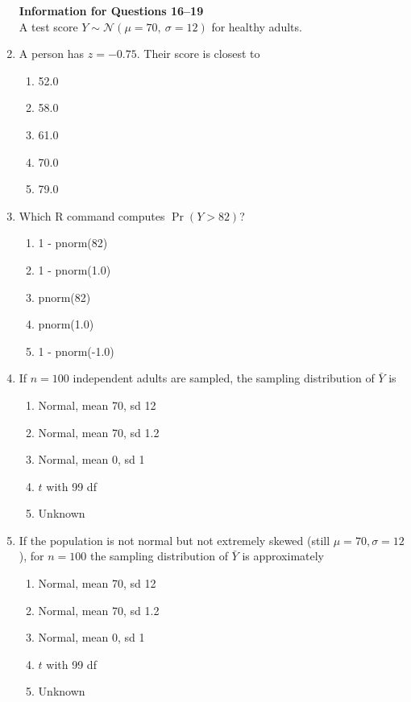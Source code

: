 \documentclass{article}
\begin{document}
\begin{enumerate}
\textbf{Information for Questions 16--19}\\
A test score $Y\sim \mathcal N(\mu=70,\ \sigma=12)$ for healthy adults.
\item A person has $z=-0.75$. Their score is closest to
    \begin{enumerate}[label=\Alph*.]
        \item 52.0
        \item 58.0
        \item 61.0
        \item 70.0
        \item 79.0
    \end{enumerate}
\item Which R command computes $\Pr(Y>82)$?
    \begin{enumerate}[label=\Alph*.]
        \item 1 - pnorm(82)
        \item 1 - pnorm(1.0)
        \item pnorm(82)
        \item pnorm(1.0)
        \item 1 - pnorm(-1.0)
    \end{enumerate}
\item If $n=100$ independent adults are sampled, the sampling distribution of $\bar Y$ is
    \begin{enumerate}[label=\Alph*.]
        \item Normal, mean 70, sd 12
        \item Normal, mean 70, sd 1.2
        \item Normal, mean 0, sd 1
        \item $t$ with 99 df
        \item Unknown
    \end{enumerate}
\item If the population is not normal but not extremely skewed (still $\mu=70,\sigma=12$), for $n=100$ the sampling distribution of $\bar Y$ is approximately
    \begin{enumerate}[label=\Alph*.]
        \item Normal, mean 70, sd 12
        \item Normal, mean 70, sd 1.2
        \item Normal, mean 0, sd 1
        \item $t$ with 99 df
        \item Unknown
    \end{enumerate}


\end{enumerate}
\end{document}
